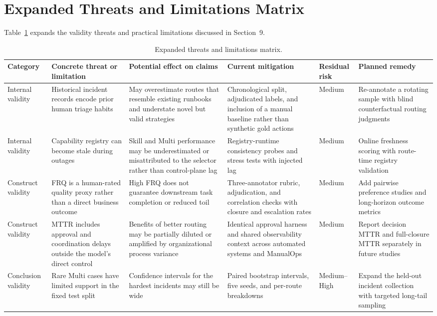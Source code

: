 \documentclass[conference]{IEEEtran}
\begin{document}
\section{Expanded Threats and Limitations Matrix}
\label{app:limits}
Table~\ref{tab:limits} expands the validity threats and practical limitations discussed in Section~9.

\begin{table}[t]
\centering
\caption{Expanded threats and limitations matrix.}
\label{tab:limits}
\scriptsize
\begin{tabular}{p{1.8cm}p{3.0cm}p{3.2cm}p{4.0cm}p{1.3cm}p{3.8cm}}
\toprule
Category & Concrete threat or limitation & Potential effect on claims & Current mitigation & Residual risk & Planned remedy \\
\midrule
Internal validity & Historical incident records encode prior human triage habits & May overestimate routes that resemble existing runbooks and understate novel but valid strategies & Chronological split, adjudicated labels, and inclusion of a manual baseline rather than synthetic gold actions & Medium & Re-annotate a rotating sample with blind counterfactual routing judgments \\
Internal validity & Capability registry can become stale during outages & Skill and Multi performance may be underestimated or misattributed to the selector rather than control-plane lag & Registry-runtime consistency probes and stress tests with injected lag & Medium & Online freshness scoring with route-time registry validation \\
Construct validity & FRQ is a human-rated quality proxy rather than a direct business outcome & High FRQ does not guarantee downstream task completion or reduced toil & Three-annotator rubric, adjudication, and correlation checks with closure and escalation rates & Medium & Add pairwise preference studies and long-horizon outcome metrics \\
Construct validity & MTTR includes approval and coordination delays outside the model's direct control & Benefits of better routing may be partially diluted or amplified by organizational process variance & Identical approval harness and shared observability context across automated systems and ManualOps & Medium & Report decision MTTR and full-closure MTTR separately in future studies \\
Conclusion validity & Rare Multi cases have limited support in the fixed test split & Confidence intervals for the hardest incidents may still be wide & Paired bootstrap intervals, five seeds, and per-route breakdowns & Medium--High & Expand the held-out incident collection with targeted long-tail sampling \\

\end{tabular}
\end{table}
\end{document}
